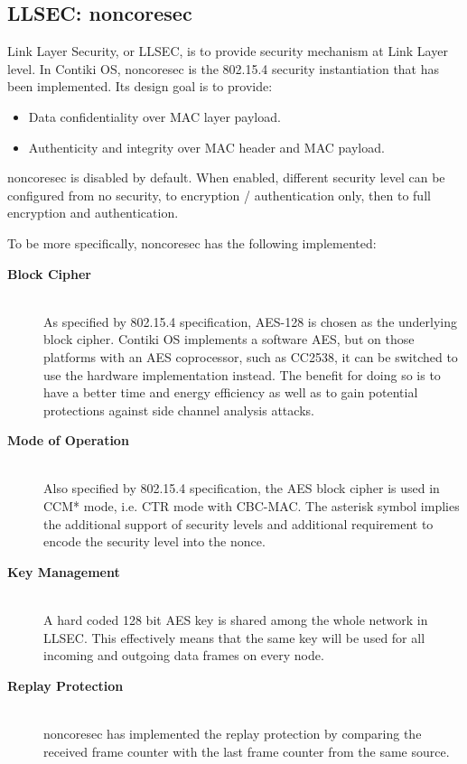 \subsection{LLSEC: noncoresec}
Link Layer Security, or LLSEC, is to provide security mechanism at Link Layer level. In Contiki OS, noncoresec is the 802.15.4 security instantiation that has been implemented. Its design goal is to provide:
\begin{itemize}
\item Data confidentiality over MAC layer payload.
\item Authenticity and integrity over MAC header and MAC payload.
\end{itemize}

noncoresec is disabled by default. When enabled, different security level can be configured from no security, to encryption / authentication only, then to full encryption and authentication.

To be more specifically, noncoresec has the following implemented:

\begin{description}
\item[\textbf{Block Cipher}] \hfill \\
As specified by 802.15.4 specification, AES-128 is chosen as the underlying block cipher. Contiki OS implements a software AES, but on those platforms with an AES coprocessor, such as CC2538, it can be switched to use the hardware implementation instead. The benefit for doing so is to have a better time and energy efficiency as well as to gain potential protections against side channel analysis attacks.

\item[\textbf{Mode of Operation}] \hfill \\
Also specified by 802.15.4 specification, the AES block cipher is used in CCM* mode, i.e. CTR mode with CBC-MAC. The asterisk symbol implies the additional support of security levels and additional requirement to encode the security level into the nonce.

\item[\textbf{Key Management}] \hfill \\
 A hard coded 128 bit AES key is shared among the whole network in LLSEC. This effectively means that the same key will be used for all incoming and outgoing data frames on every node.
 
\item[\textbf{Replay Protection}] \hfill \\
noncoresec has implemented the replay protection by comparing the received frame counter with the last frame counter from the same source.
\end{description}

